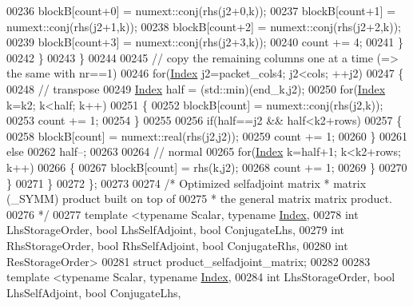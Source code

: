\begin{DoxyCode}
00236           blockB[count+0] = numext::conj(rhs(j2+0,k));
00237           blockB[count+1] = numext::conj(rhs(j2+1,k));
00238           blockB[count+2] = numext::conj(rhs(j2+2,k));
00239           blockB[count+3] = numext::conj(rhs(j2+3,k));
00240           count += 4;
00241         \}
00242       \}
00243     \}
00244 
00245     \textcolor{comment}{// copy the remaining columns one at a time (=> the same with nr==1)}
00246     \textcolor{keywordflow}{for}(\hyperlink{namespace_eigen_a62e77e0933482dafde8fe197d9a2cfde}{Index} j2=packet\_cols4; j2<cols; ++j2)
00247     \{
00248       \textcolor{comment}{// transpose}
00249       \hyperlink{namespace_eigen_a62e77e0933482dafde8fe197d9a2cfde}{Index} half = (std::min)(end\_k,j2);
00250       \textcolor{keywordflow}{for}(\hyperlink{namespace_eigen_a62e77e0933482dafde8fe197d9a2cfde}{Index} k=k2; k<half; k++)
00251       \{
00252         blockB[count] = numext::conj(rhs(j2,k));
00253         count += 1;
00254       \}
00255 
00256       \textcolor{keywordflow}{if}(half==j2 && half<k2+rows)
00257       \{
00258         blockB[count] = numext::real(rhs(j2,j2));
00259         count += 1;
00260       \}
00261       \textcolor{keywordflow}{else}
00262         half--;
00263 
00264       \textcolor{comment}{// normal}
00265       \textcolor{keywordflow}{for}(\hyperlink{namespace_eigen_a62e77e0933482dafde8fe197d9a2cfde}{Index} k=half+1; k<k2+rows; k++)
00266       \{
00267         blockB[count] = rhs(k,j2);
00268         count += 1;
00269       \}
00270     \}
00271   \}
00272 \};
00273 
00274 \textcolor{comment}{/* Optimized selfadjoint matrix * matrix (\_SYMM) product built on top of}
00275 \textcolor{comment}{ * the general matrix matrix product.}
00276 \textcolor{comment}{ */}
00277 \textcolor{keyword}{template} <\textcolor{keyword}{typename} Scalar, \textcolor{keyword}{typename} \hyperlink{namespace_eigen_a62e77e0933482dafde8fe197d9a2cfde}{Index},
00278           \textcolor{keywordtype}{int} LhsStorageOrder, \textcolor{keywordtype}{bool} LhsSelfAdjoint, \textcolor{keywordtype}{bool} ConjugateLhs,
00279           \textcolor{keywordtype}{int} RhsStorageOrder, \textcolor{keywordtype}{bool} RhsSelfAdjoint, \textcolor{keywordtype}{bool} ConjugateRhs,
00280           \textcolor{keywordtype}{int} ResStorageOrder>
00281 \textcolor{keyword}{struct }product\_selfadjoint\_matrix;
00282 
00283 \textcolor{keyword}{template} <\textcolor{keyword}{typename} Scalar, \textcolor{keyword}{typename} \hyperlink{namespace_eigen_a62e77e0933482dafde8fe197d9a2cfde}{Index},
00284           \textcolor{keywordtype}{int} LhsStorageOrder, \textcolor{keywordtype}{bool} LhsSelfAdjoint, \textcolor{keywordtype}{bool} ConjugateLhs,

\end{DoxyCode}
